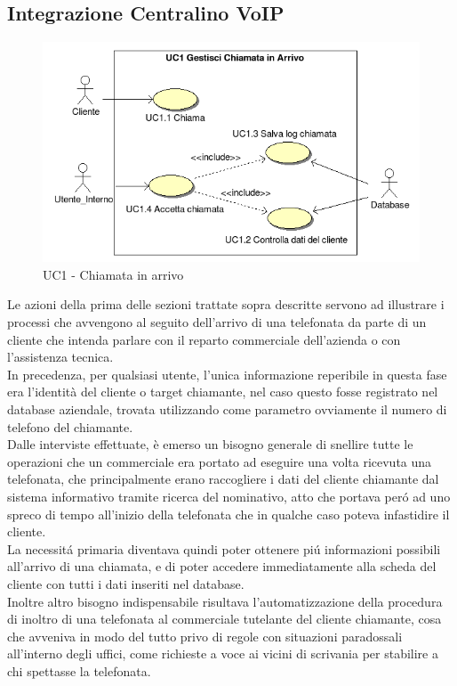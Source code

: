 \newpage
\subsection{Integrazione Centralino VoIP}
\begin{figure}[!ht]
\centering
 \includegraphics[scale=0.8]{./images/UC1_chiamata.png}
\caption{UC1 - Chiamata in arrivo}
\end{figure}

\noindent
Le azioni della prima delle sezioni trattate sopra descritte servono ad illustrare i processi che avvengono al seguito dell'arrivo di una telefonata da parte di un cliente che intenda parlare con il reparto commerciale dell'azienda o con l'assistenza tecnica. \\
In precedenza, per qualsiasi utente, l'unica informazione reperibile in questa fase era l'identit\`a del cliente o target chiamante, nel caso questo fosse registrato nel database aziendale, trovata utilizzando come parametro ovviamente il numero di telefono del chiamante. \\
Dalle interviste effettuate, \`e emerso un bisogno generale di snellire tutte le operazioni che un commerciale era portato ad eseguire una volta ricevuta una telefonata, che principalmente erano raccogliere i dati del cliente chiamante dal sistema informativo tramite ricerca del nominativo, atto che portava per\'o ad uno spreco di tempo all'inizio della telefonata che in qualche caso poteva infastidire il cliente. \\
La necessit\'a primaria diventava quindi poter ottenere pi\'u informazioni possibili all'arrivo di una chiamata, e di poter accedere immediatamente alla scheda del cliente con tutti i dati inseriti nel database.\\
Inoltre altro bisogno indispensabile risultava l'automatizzazione della procedura di inoltro di una telefonata al commerciale tutelante del cliente chiamante, cosa che avveniva in modo del tutto privo di regole con situazioni paradossali all'interno degli uffici, come richieste a voce ai vicini di scrivania per stabilire a chi spettasse la telefonata.

